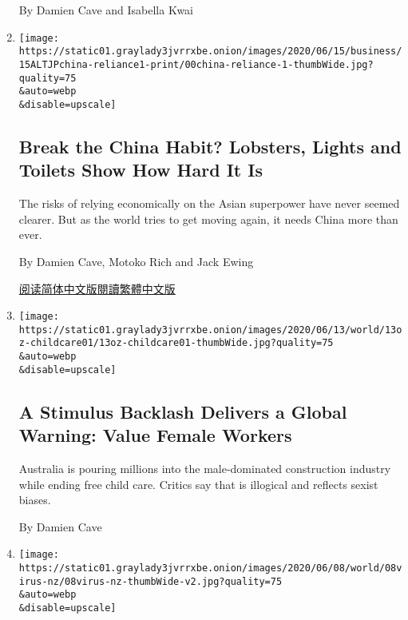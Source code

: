 \begin{enumerate}
  By Damien Cave and Isabella Kwai
\item
  \href{/2020/06/15/business/china-decoupling.html}{}

  \texttt{[image: https://static01.graylady3jvrrxbe.onion/images/2020/06/15/business/15ALTJPchina-reliance1-print/00china-reliance-1-thumbWide.jpg?quality=75\\\&auto=webp\\\&disable=upscale]}

  \hypertarget{break-the-china-habit-lobsters-lights-and-toilets-show-how-hard-it-is}{%
  \subsection{Break the China Habit? Lobsters, Lights and Toilets Show
  How Hard It
  Is}\label{break-the-china-habit-lobsters-lights-and-toilets-show-how-hard-it-is}}

  The risks of relying economically on the Asian superpower have never
  seemed clearer. But as the world tries to get moving again, it needs
  China more than ever.

  By Damien Cave, Motoko Rich and Jack Ewing

  \href{https://cn.nytimes3xbfgragh.onion/business/20200615/china-decoupling/}{阅读简体中文版}\href{https://cn.nytimes3xbfgragh.onion/business/20200615/china-decoupling/zh-hant/}{閱讀繁體中文版}
\item
  \href{/2020/06/14/world/australia/coronavirus-stimulus-childcare-women.html}{}

  \texttt{[image: https://static01.graylady3jvrrxbe.onion/images/2020/06/13/world/13oz-childcare01/13oz-childcare01-thumbWide.jpg?quality=75\\\&auto=webp\\\&disable=upscale]}

  \hypertarget{a-stimulus-backlash-delivers-a-global-warning-value-female-workers}{%
  \subsection{A Stimulus Backlash Delivers a Global Warning: Value
  Female
  Workers}\label{a-stimulus-backlash-delivers-a-global-warning-value-female-workers}}

  Australia is pouring millions into the male-dominated construction
  industry while ending free child care. Critics say that is illogical
  and reflects sexist biases.

  By Damien Cave
\item
  \href{/2020/06/08/world/australia/new-zealand-coronavirus-ardern.html}{}

  \texttt{[image: https://static01.graylady3jvrrxbe.onion/images/2020/06/08/world/08virus-nz/08virus-nz-thumbWide-v2.jpg?quality=75\\\&auto=webp\\\&disable=upscale]}


\end{enumerate}
